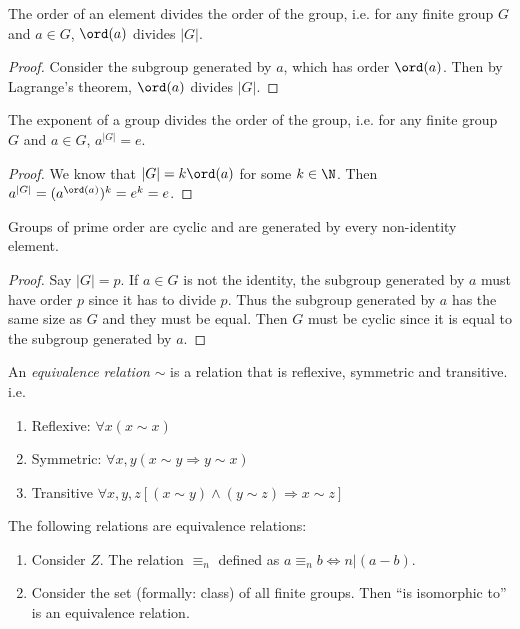 \documentclass[a4paper]{article}
\begin{document}
  \begin{cor}
    The order of an element divides the order of the group, i.e. for any finite group $G$ and $a\in G$, $\ord(a)$ divides $|G|$.
  \end{cor}
  \begin{proof}
    Consider the subgroup generated by $a$, which has order $\ord(a)$. Then by Lagrange's theorem, $\ord(a)$ divides $|G|$.
  \end{proof}

  \begin{cor}
    The exponent of a group divides the order of the group, i.e. for any finite group $G$ and $a\in G$, $a^{|G|} = e$.
  \end{cor}

  \begin{proof}
    We know that $|G| = k\ord(a)$ for some $k\in \N$. Then $a^{|G|} = (a^{\ord(a)})^k = e^k = e$.
  \end{proof}

  \begin{cor}
    Groups of prime order are cyclic and are generated by every non-identity element.
  \end{cor}

  \begin{proof}
    Say $|G| = p$. If $a\in G$ is not the identity, the subgroup generated by $a$ must have order $p$ since it has to divide $p$. Thus the subgroup generated by $a$ has the same size as $G$ and they must be equal. Then $G$ must be cyclic since it is equal to the subgroup generated by $a$.
  \end{proof}

  \begin{defi}
    An \emph{equivalence relation} $\sim$ is a relation that is reflexive, symmetric and transitive. i.e.
    \begin{enumerate}
      \item Reflexive: $\forall x(x\sim x)$
      \item Symmetric: $\forall x, y(x\sim y \Rightarrow y\sim x)$
      \item Transitive $\forall x, y, z[(x\sim y) \wedge (y\sim z)\Rightarrow x\sim z]$
    \end{enumerate}
  \end{defi}

  \begin{eg}
    The following relations are equivalence relations:
    \begin{enumerate}
      \item Consider $Z$. The relation $\equiv_n$ defined as $a\equiv_n b \Leftrightarrow n | (a - b)$.
      \item Consider the set (formally: class) of all finite groups. Then ``is isomorphic to'' is an equivalence relation.
    \end{enumerate}
  \end{eg}
\end{document}
